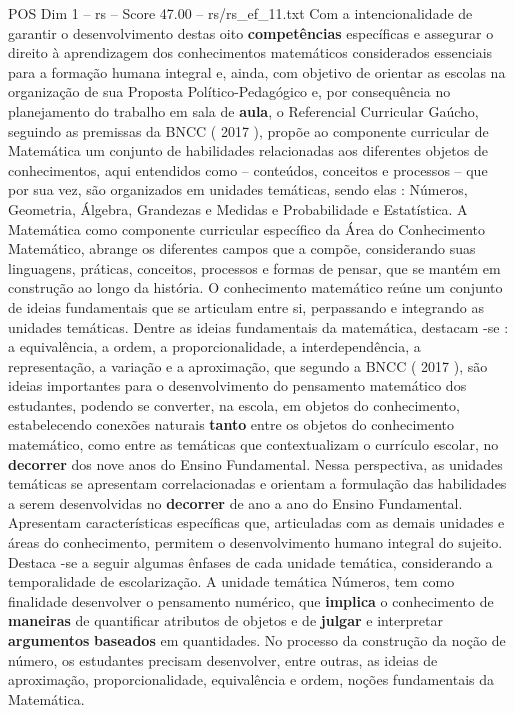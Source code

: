 \begin{textsample}{POS Dim 1 – rs – Score 47.00 – rs/rs\_ef\_11.txt}
Com a intencionalidade de garantir o desenvolvimento destas oito \textbf{competências} específicas e assegurar o direito à aprendizagem dos conhecimentos matemáticos considerados essenciais para a formação humana integral e, ainda, com objetivo de orientar as escolas na organização de sua Proposta Político-Pedagógico e, por consequência no planejamento do trabalho em sala de \textbf{aula}, o Referencial Curricular Gaúcho, seguindo as premissas da BNCC ( 2017 ), propõe ao componente curricular de Matemática um conjunto de habilidades relacionadas aos diferentes objetos de conhecimentos, aqui entendidos como – conteúdos, conceitos e processos – que por sua vez, são organizados em unidades temáticas, sendo elas : Números, Geometria, Álgebra, Grandezas e Medidas e Probabilidade e Estatística.
A Matemática como componente curricular específico da Área do Conhecimento Matemático, abrange os diferentes campos que a compõe, considerando suas linguagens, práticas, conceitos, processos e formas de pensar, que se mantém em construção ao longo da história.
O conhecimento matemático reúne um conjunto de ideias fundamentais que se articulam entre si, perpassando e integrando as unidades temáticas.
Dentre as ideias fundamentais da matemática, destacam -se : a equivalência, a ordem, a proporcionalidade, a interdependência, a representação, a variação e a aproximação, que segundo a BNCC ( 2017 ), são ideias importantes para o desenvolvimento do pensamento matemático dos estudantes, podendo se converter, na escola, em objetos do conhecimento, estabelecendo conexões naturais \textbf{tanto} entre os objetos do conhecimento matemático, como entre as temáticas que contextualizam o currículo escolar, no \textbf{decorrer} dos nove anos do Ensino Fundamental.
Nessa perspectiva, as unidades temáticas se apresentam correlacionadas e orientam a formulação das habilidades a serem desenvolvidas no \textbf{decorrer} de ano a ano do Ensino Fundamental.
Apresentam características específicas que, articuladas com as demais unidades e áreas do conhecimento, permitem o desenvolvimento humano integral do sujeito.
Destaca -se a seguir algumas ênfases de cada unidade temática, considerando a temporalidade de escolarização.
A unidade temática Números, tem como finalidade desenvolver o pensamento numérico, que \textbf{implica} o conhecimento de \textbf{maneiras} de quantificar atributos de objetos e de \textbf{julgar} e interpretar \textbf{argumentos} \textbf{baseados} em quantidades.
No processo da construção da noção de número, os estudantes precisam desenvolver, entre outras, as ideias de aproximação, proporcionalidade, equivalência e ordem, noções fundamentais da Matemática.

\end{textsample}
